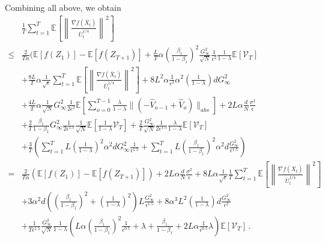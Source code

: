 \documentclass[11pt]{article}
\begin{document}
Combining all above, we obtain
\begingroup
\allowdisplaybreaks
\begin{align}\label{eq: final_bound}
 &\frac{1}{T}\sum_{t=1}^T  \mathbb E \left [\left\|\frac{\nabla f( \overline X_{t})}{\overline U_{t}^{1/4}}\right\|^2  \right] \nonumber  \\
 \leq & \frac{2}{T\alpha} ( \mathbb E  [f( Z_{1})]  -  \mathbb E [f( Z_{T+1})] 
+ \frac{L}{T}   \alpha \left ( \frac{\beta_1}{1-\beta_1} \right)^2   \frac{ G_{\infty} ^2 }{\sqrt{N}}   \frac{1}{{\epsilon^2}} \frac{1}{1-\lambda}  \mathbb E \left[ \mathcal{V}_T \right]   \nonumber  \\
& + \frac{8L}{T}\alpha\frac{1}{\sqrt{\epsilon}} \sum_{t=1}^T \mathbb E \left[  \left\| \frac{\nabla f(\overline X_{t})}{{\overline U_t^{1/4}}  } \right\|^2 \right] + {8L^2}\alpha  \frac{1}{\epsilon^2}  \alpha^2 \left( \frac{1}{1-\lambda}\right)d G_{\infty}^2 \nonumber \\
& +  \frac{4L}{T}\alpha \frac{1}{\sqrt{N}}  G_{\infty}^2 \frac{1}{2\epsilon^2}   \mathbb E \left[   \sum_{o=0}^{T-1} \frac{\lambda}{1-\lambda}     \|    (- \hat V_{o-1} + \hat V_{o} ) \|_{abs}    \right]  +  {2L}\alpha  \frac{d}{N}
\frac{ \sigma^2 }{\epsilon} \nonumber  \\
&+ \frac{2}{T}\frac{\beta_1}{1-\beta_1} G_{\infty}^2 \frac{1}{2\epsilon^{1.5}} \frac{1}{\sqrt{N}}   \mathbb E \left [  \frac{1}{1-\lambda}   \mathcal{V}_T   \right] + \frac{2}{T} \frac{G_{\infty}^2}{\sqrt{N}}\frac{1}{2\epsilon^{1.5}} \frac{\lambda}{1-\lambda}   \mathbb E \left[ \mathcal{V}_T \right]\nonumber   \\
& + \frac{3}{T} \left ( \sum_{t=1} ^TL\left (\frac{1}{1-\lambda} \right)^2 \alpha ^ 2d G_{\infty}^2 \frac{1}{\epsilon^{1.5}} + \sum_{t=1}^T L\left( \frac{\beta_1}{1-\beta_1}\right)^2 \alpha^2 d \frac{G_{\infty}^2}{\epsilon^{1.5}}\right) \nonumber \\
= &  \frac{2}{T\alpha} ( \mathbb E  [f( Z_{1})]  -  \mathbb E [f( Z_{T+1})]) +  {2L}\alpha  \frac{d}{N}
\frac{ \sigma^2 }{\epsilon} + {8L}\alpha\frac{1}{\sqrt{\epsilon}} \frac{1}{T} \sum_{t=1}^T \mathbb E \left[  \left\| \frac{\nabla f(\overline X_{t})}{{\overline U_t^{1/4}}  } \right\|^2 \right] \nonumber \\
&+  3\alpha^2 d \left(\left( \frac{\beta_1}{1-\beta_1}\right)^2 + \left (\frac{1}{1-\lambda} \right)^2 \right)L  \frac{G_{\infty}^2 }{\epsilon^{1.5}} +  {8}\alpha^3 L^2     \left( \frac{1}{1-\lambda}\right)d \frac{G_{\infty}^2}{\epsilon^2} \nonumber \\
& +   \frac{1}{T \epsilon^{1.5}}  \frac{G_{\infty}^2}{\sqrt{N}} \frac{1}{1-\lambda}  \left( L  \alpha \left ( \frac{\beta_1}{1-\beta_1} \right)^2     \frac{1}{{\epsilon^{0.5}}}  +   \lambda + \frac{\beta_1}{1-\beta_1} + 2L\alpha \frac{1}{\epsilon^{0.5}}\lambda   \right)   \mathbb E \left[ \mathcal{V}_T \right] \, .
\end{align}
\end{document}
